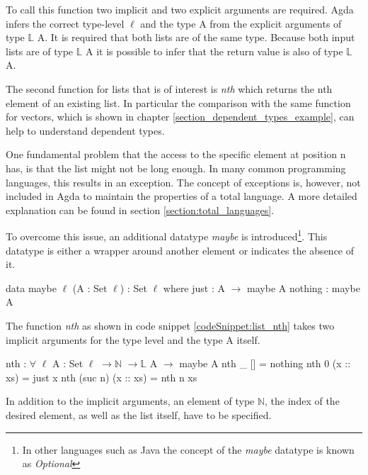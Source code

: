 To call this function two implicit and two explicit arguments are required. 
Agda infers the correct type-level $\ell$ and the type A from the explicit arguments of type $\mathbb{L}$ A. 
It is required that both lists are of the same type. 
Because both input lists are of type $\mathbb{L}$ A it is possible to infer that the return value is also of type $\mathbb{L}$ A.

The second function for lists that is of interest is \emph{nth} which returns the nth element of an existing list.
In particular the comparison with the same function for vectors, which is shown in chapter \ref{section_dependent_types_example}, can help to understand dependent types.

One fundamental problem that the access to the specific element at position n has, is that the list might not be long enough.
In many common programming languages, this results in an exception. The concept of exceptions is, however, not included in Agda to maintain the properties of a total language.
A more detailed explanation can be found in section \ref{section:total_languages}.

To overcome this issue, an additional datatype \emph{maybe} is introduced\footnote{In other languages such as Java the concept of the \emph{maybe} datatype is known as \emph{Optional}}.
This datatype is either a wrapper around another element or indicates the absence of it.

\begin{codesnippet}[mathescape=true, caption={Definition of the maybe datatype in Agda}, label={codeSnippet:maybe_datatype}]
data maybe {$\ell$} (A : Set $\ell$) : Set $\ell$ where
  just : A $\rightarrow$ maybe A
  nothing : maybe A
\end{codesnippet}

The function \emph{nth} as shown in code snippet \ref{codeSnippet:list_nth} takes two implicit arguments for the type level and the type A itself.

\begin{codesnippet}[mathescape=true, caption={Definition of nth function in Agda}, label={codeSnippet:list_nth}]
nth : $\forall$ {$\ell$} {A : Set $\ell$} $\rightarrow \mathbb{N}$ $\rightarrow \mathbb{L}$ A $\rightarrow$ maybe A
nth _ [] = nothing
nth 0 (x :: xs) = just x
nth (suc n) (x :: xs) = nth n xs
\end{codesnippet}

In addition to the implicit arguments, an element of type $\mathbb{N}$, the index of the desired element, as well as the list itself, have to be specified.

